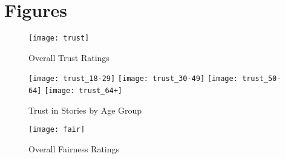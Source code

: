 \chapter{Figures}

\vspace*{-3in}
\newpage

\begin{figure}[h!]  
\centering 
  \texttt{[image: trust]}  
  \caption{Overall Trust Ratings
    \label{fig:trust}}
\end{figure}

\newpage
\begin{figure}[h!] 
\centering 
  \texttt{[image: trust\_18-29]} 
  \texttt{[image: trust\_30-49]} 
  \texttt{[image: trust\_50-64]} 
  \texttt{[image: trust\_64+]} 
  \caption{Trust in Stories by Age Group
    \label{fig:trust-by-age}}
\end{figure}


\begin{figure}[h!]  
\centering 
  \texttt{[image: fair]}  
  \caption{Overall Fairness Ratings
    \label{fig:fair}}
\end{figure}

\newpage




%  
